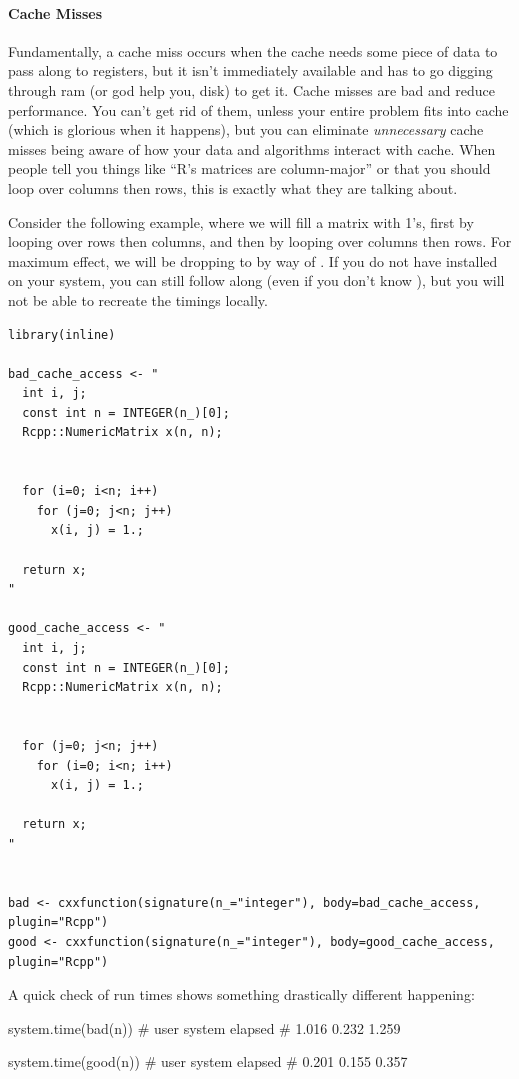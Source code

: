 \paragraph{Cache Misses} Fundamentally, a cache miss occurs when the cache needs some piece of data to pass along to registers, but it isn't immediately available and has to go digging through ram (or god help you, disk) to get it.  Cache misses are bad and reduce performance.  You can't get rid of them, unless your entire problem fits into cache (which is glorious when it happens), but you can eliminate \emph{unnecessary} cache misses being aware of how your data and algorithms interact with cache.  When people tell you things like ``R's matrices are column-major'' or that you should loop over columns then rows, this is exactly what they are talking about.

Consider the following example, where we will fill a matrix with 1's, first by looping over rows then columns, and then by looping over columns then rows.  For maximum effect, we will be dropping to \C by way of .  If you do not have  installed on your system, you can still follow along (even if you don't know \CXX), but you will not be able to recreate the timings locally.
\begin{lstlisting}
library(inline)

bad_cache_access <- "
  int i, j;
  const int n = INTEGER(n_)[0];
  Rcpp::NumericMatrix x(n, n);
  
  
  for (i=0; i<n; i++)
    for (j=0; j<n; j++)
      x(i, j) = 1.;
  
  return x;
"

good_cache_access <- "
  int i, j;
  const int n = INTEGER(n_)[0];
  Rcpp::NumericMatrix x(n, n);
  
  
  for (j=0; j<n; j++)
    for (i=0; i<n; i++)
      x(i, j) = 1.;
  
  return x;
"


bad <- cxxfunction(signature(n_="integer"), body=bad_cache_access, plugin="Rcpp")
good <- cxxfunction(signature(n_="integer"), body=good_cache_access, plugin="Rcpp")
\end{lstlisting}

A quick check of run times shows something drastically different happening:
\begin{Output}
system.time(bad(n))
#   user  system elapsed 
#  1.016   0.232   1.259 

system.time(good(n))
#   user  system elapsed 
#  0.201   0.155   0.357 
\end{Output}

